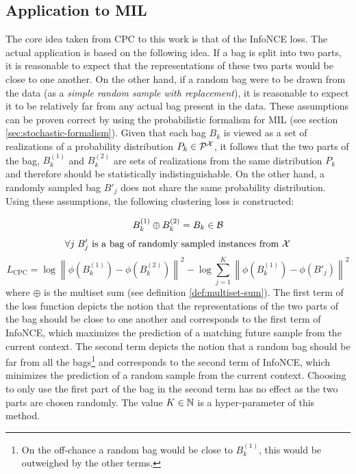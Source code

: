 \subsection{Application to MIL}\label{subsec:CPC-application}

The core idea taken from CPC to this work is that of the InfoNCE loss. The actual application is based on the following idea. If a bag is split into two parts, it is reasonable to expect that the representations of these two parts would be close to one another. On the other hand, if a random bag were to be drawn from the data (as a \textit{simple random sample with replacement}), it is reasonable to expect it to be relatively far from any actual bag present in the data. These assumptions can be proven correct by using the probabilistic formalism for MIL (see section \ref{sec:stochastic-formalism}). Given that each bag \( B_k \) is viewed as a set of realizations of a probability distribution \( P_k \in \mathcal{P}^\mathspace{X} \), it follows that the two parts of the bag, \( B_k^{(1)} \) and \( B_k^{(2)} \) are sets of realizations from the same distribution \( P_k \) and therefore should be statistically indistinguishable. On the other hand, a randomly sampled bag \( B'_j \) does not share the same probability distribution.
Using these assumptions, the following clustering loss is constructed:

\[ B_k^{(1)} \oplus B_k^{(2)} = B_k \in \mathcal{B} \]
\[ \forall j \; B'_j \text{ is a bag of randomly sampled instances from } \mathcal{X} \]
\[ L_\mathrm{CPC} = \log \left\lVert \phi \left( B_k^{(1)} \right) - \phi \left( B_k^{(2)} \right) \right\rVert^2 - \log \sum_{j = 1}^K \left\lVert \phi \left( B_k^{(1)} \right) - \phi \left( B'_j \right) \right\rVert^2 \]
where \( \oplus \) is the multiset sum (see definition \ref{def:multiset-sum}). The first term of the loss function depicts the notion that the representations of the two parts of the bag should be close to one another and corresponds to the first term of InfoNCE, which maximizes the prediction of a matching future sample from the current context. The second term depicts the notion that a random bag should be far from all the bags\footnote{On the off-chance a random bag would be close to \( B_k^{(1)} \), this would be outweighed by the other terms.} and corresponds to the second term of InfoNCE, which minimizes the prediction of a random sample from the current context. Choosing to only use the first part of the bag in the second term has no effect as the two parts are chosen randomly. The value \( K \in \mathbb{N} \) is a hyper-parameter of this method.


